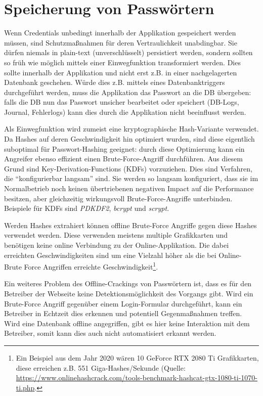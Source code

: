 \section{Speicherung von Passwörtern}
\label{password_storage}

Wenn Credentials unbedingt innerhalb der Applikation gespeichert werden müssen, sind Schutzmaßnahmen für deren Vertraulichkeit unabdingbar. Sie dürfen niemals in plain-text (unverschlüsselt) persistiert werden, sondern sollten so früh wie möglich mittels einer Einwegfunktion transformiert werden. Dies sollte innerhalb der Applikation und nicht erst z.B. in einer nachgelagerten Datenbank geschehen. Würde dies z.B. mittels eines Datenbanktriggers durchgeführt werden, muss die Applikation das Passwort an die DB übergeben: falls die DB nun das Passwort unsicher bearbeitet oder speichert (DB-Logs, Journal, Fehlerlogs) kann dies durch die Applikation nicht beeinflusst werden.

Als Einwegfunktion wird zumeist eine kryptographische Hash-Variante verwendet. Da Hashes auf deren Geschwindigkeit hin optimiert wurden, sind diese eigentlich suboptimal für Passwort-Hashing geeignet: durch diese Optimierung kann ein Angreifer ebenso effizient einen Brute-Force-Angriff durchführen. Aus diesem Grund sind Key-Derivation-Functions (KDFs) vorzuziehen. Dies sind Verfahren, die ``konfigurierbar langsam'' sind. Sie werden so langsam konfiguriert, dass sie im Normalbetrieb noch keinen übertriebenen negativen Impact auf die Performance besitzen, aber gleichzeitig wirkungsvoll Brute-Force-Angriffe unterbinden. Beispiele für KDFs sind \textit{PDKDF2}, \textit{bcrypt} und \textit{scrypt}.

Werden Hashes extrahiert können offline Brute-Force Angriffe gegen diese Hashes verwendet werden. Diese verwenden meistens multiple Grafikkarten und benötigen keine online Verbindung zu der Online-Applikation. Die dabei erreichten Geschwindigkeiten sind um eine Vielzahl höher als die bei Online-Brute Force Angriffen erreichte Geschwindigkeit\footnote{Ein Beispiel aus dem Jahr 2020 wären 10 GeForce RTX 2080 Ti Grafikkarten, diese erreichen z.B. 551 Giga-Hashes/Sekunde (Quelle: \url{https://www.onlinehashcrack.com/tools-benchmark-hashcat-gtx-1080-ti-1070-ti.php}.}.

Ein weiteres Problem des Offline-Crackings von Passwörtern ist, dass es für den Betreiber der Webseite keine Detektionsmöglichkeit des Vorgangs gibt. Wird ein Brute-Force Angriff gegenüber einem Login-Formular durchgeführt, kann ein Betreiber in Echtzeit dies erkennen und potentiell Gegenmaßnahmen treffen. Wird eine Datenbank offline angegriffen, gibt es hier keine Interaktion mit dem Betreiber, somit kann dies auch nicht automatisiert erkannt werden.

